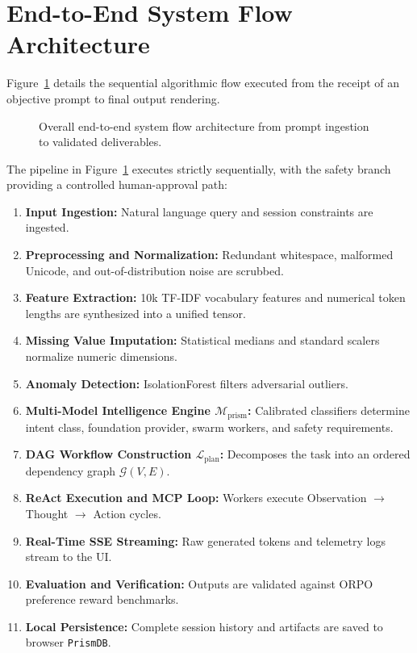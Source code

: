 \documentclass[12pt,a4paper]{report}
\begin{document}
\section{End-to-End System Flow Architecture}
Figure~\ref{fig:system_flow} details the sequential algorithmic flow executed from the receipt of an objective prompt to final output rendering.

\begin{figure}[H]
    \centering
    \caption{Overall end-to-end system flow architecture from prompt ingestion to validated deliverables.}
    \label{fig:system_flow}
\end{figure}

The pipeline in Figure~\ref{fig:system_flow} executes strictly sequentially, with the safety branch providing a controlled human-approval path:
\begin{enumerate}
    \item \textbf{Input Ingestion:} Natural language query and session constraints are ingested.
    \item \textbf{Preprocessing and Normalization:} Redundant whitespace, malformed Unicode, and out-of-distribution noise are scrubbed.
    \item \textbf{Feature Extraction:} 10k TF-IDF vocabulary features and numerical token lengths are synthesized into a unified tensor.
    \item \textbf{Missing Value Imputation:} Statistical medians and standard scalers normalize numeric dimensions.
    \item \textbf{Anomaly Detection:} IsolationForest filters adversarial outliers.
    \item \textbf{Multi-Model Intelligence Engine $\mathcal{M}_{\text{prism}}$:} Calibrated classifiers determine intent class, foundation provider, swarm workers, and safety requirements.
    \item \textbf{DAG Workflow Construction $\mathcal{L}_{\text{plan}}$:} Decomposes the task into an ordered dependency graph $\mathcal{G}(V, E)$.
    \item \textbf{ReAct Execution and MCP Loop:} Workers execute Observation $\to$ Thought $\to$ Action cycles.
    \item \textbf{Real-Time SSE Streaming:} Raw generated tokens and telemetry logs stream to the UI.
    \item \textbf{Evaluation and Verification:} Outputs are validated against ORPO preference reward benchmarks.
    \item \textbf{Local Persistence:} Complete session history and artifacts are saved to browser \texttt{PrismDB}.
\end{enumerate}
\end{document}
